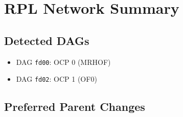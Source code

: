 \documentclass{article}
\begin{document}
\section*{RPL Network Summary}
\subsection*{Detected DAGs}
\begin{itemize}
  \item DAG \texttt{fd00}: OCP 0 (MRHOF)
  \item DAG \texttt{fd02}: OCP 1 (OF0)
\end{itemize}

\subsection*{Preferred Parent Changes}
\end{document}
